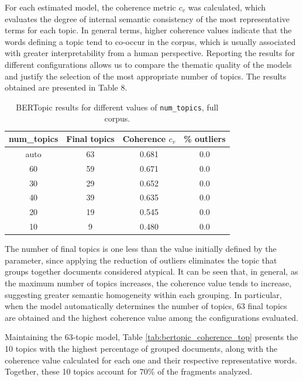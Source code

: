 \documentclass[pdflatex,sn-mathphys-num, iicol]{sn-jnl}
\begin{document}
	 For each estimated model, the coherence metric $c_v$ was calculated, which evaluates the
	 degree of internal semantic consistency of the most representative terms for each topic. In
	 general terms, higher coherence values indicate that the words defining a topic tend to co-occur
	 in the corpus, which is usually associated with greater interpretability from a human perspective.
	 Reporting the results for different configurations allows us to compare the thematic quality
	 of the models and justify the selection of the most appropriate number of topics. The results
	 obtained are presented in Table 8.
	 
	\begin{table}[h!]
		\caption{BERTopic results for different values of \texttt{num\_topics}, full corpus.}
		\label{tab:coherence_topics}
		\centering
		\footnotesize
		\begin{tabular}{@{}cccc@{}}
			\toprule
			\textbf{num\_topics} & \textbf{Final topics} & \textbf{Coherence $c_v$} & \textbf{\% outliers} \\
			\midrule
			auto & 63 & 0.681 & 0.0 \\
			60   & 59 & 0.671 & 0.0 \\
			30   & 29 & 0.652 & 0.0 \\
			40   & 39 & 0.635 & 0.0 \\
			20   & 19 & 0.545 & 0.0 \\
			10   & 9  & 0.480 & 0.0 \\
			\bottomrule
		\end{tabular}
	\end{table}
	
	The number of final topics is one less than the value initially defined by the parameter, since applying the reduction of outliers eliminates the topic that groups together documents considered atypical. It can be seen that, in general, as the maximum number of topics increases, the coherence value tends to increase, suggesting greater semantic homogeneity within each grouping. In particular, when the model automatically determines the number of topics, 63 final topics are obtained and the highest coherence value among the configurations evaluated.
	
	Maintaining the 63-topic model, Table \ref{tab:bertopic_coherence_top} presents the 10 topics with the highest percentage of grouped documents, along with the coherence value calculated for each one and their respective representative words. Together, these 10 topics account for 70\% of the fragments analyzed.
	
\end{document}
